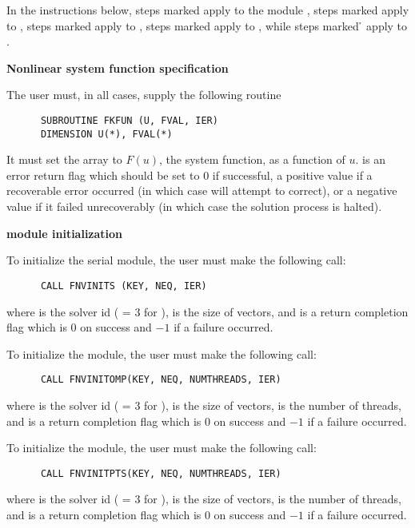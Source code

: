 In the instructions below,
steps marked {\s} apply to the {\nvector} module {\nvecs},
steps marked {\omp} apply to {\nvecopenmp},
steps marked {\pt} apply to {\nvecpthreads},
steps marked {\p} apply to {\nvecp}, while
steps marked {\h} apply to {\nvecph}.
%
\begin{Steps}
 
\item {\bf Nonlinear system function specification}
  
  The user must, in all cases, supply the following {\F} routine
\begin{verbatim}
      SUBROUTINE FKFUN (U, FVAL, IER)
      DIMENSION U(*), FVAL(*)
\end{verbatim}
  It must set the  array to $F(u)$, the system function,
  as a function of  $u$.  
   is an error return flag which should be set to $0$ if successful,
  a positive value if a recoverable error occurred (in which case {\kinsol}
  will attempt to correct), or a negative value if it failed unrecoverably
  (in which case the solution process is halted).

\item  {\bf {\nvector} module initialization}

  {\s} To initialize the serial {\nvector} module, the user must make the
  following call:
\begin{verbatim}
      CALL FNVINITS (KEY, NEQ, IER)
\end{verbatim}
  where 
   is the solver id ( = 3 for {\kinsol}),
   is the size of vectors, and
   is a  return completion flag which is $0$ on success and $-1$ 
  if a failure occurred.

  {\omp} To initialize the {\nvecopenmp} {\nvector} module, the user must make the
  following call:
\begin{verbatim}
      CALL FNVINITOMP(KEY, NEQ, NUMTHREADS, IER)
\end{verbatim}
  where 
   is the solver id ( = 3 for {\kinsol}),
   is the size of vectors,
   is the number of threads, and
   is a return completion flag which is $0$ on success and $-1$ 
  if a failure occurred.
  
  {\pt} To initialize the {\nvecpthreads} {\nvector} module, the user must make the
  following call:
\begin{verbatim}
      CALL FNVINITPTS(KEY, NEQ, NUMTHREADS, IER)
\end{verbatim}
  where 
   is the solver id ( = 3 for {\kinsol}),
   is the size of vectors,
   is the number of threads, and
   is a return completion flag which is $0$ on success and $-1$ 
  if a failure occurred.
  

\end{Steps}
